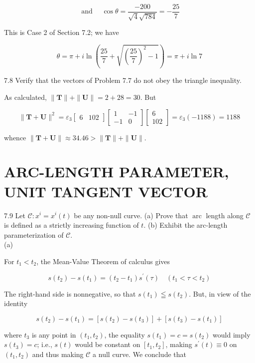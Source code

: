 \documentclass[10pt]{article}
\begin{document}
$$
\text { and } \quad \cos \theta=\frac{-200}{\sqrt{4} \sqrt{784}}=-\frac{25}{7}
$$

This is Case 2 of Section 7.2; we have

$$
\theta=\pi+i \ln \left(\frac{25}{7}+\sqrt{\left(\frac{25}{7}\right)^{2}-1}\right)=\pi+i \ln 7
$$

7.8 Verify that the vectors of Problem 7.7 do not obey the triangle inequality.

As calculated, $\|\mathbf{T}\|+\|\mathbf{U}\|=2+28=30$. But

$$
\|\mathbf{T}+\mathbf{U}\|^{2}=\varepsilon_{3}\left[\begin{array}{ll}
6 & 102
\end{array}\right]\left[\begin{array}{rr}
1 & -1 \\
-1 & 0
\end{array}\right]\left[\begin{array}{c}
6 \\
102
\end{array}\right]=\varepsilon_{3}(-1188)=1188
$$

whence $\|\mathbf{T}+\mathbf{U}\| \approx 34.46>\|\mathbf{T}\|+\|\mathbf{U}\|$.

\section*{ARC-LENGTH PARAMETER, UNIT TANGENT VECTOR}
7.9 Let $\mathscr{C}: x^{i}=x^{i}(t)$ be any non-null curve. (a) Prove that $\operatorname{arc}$ length along $\mathscr{C}$ is defined as a strictly increasing function of $t$. (b) Exhibit the arc-length parameterization of $\mathscr{C}$.\\
(a)

For $t_{1}<t_{2}$, the Mean-Value Theorem of calculus gives

$$
s\left(t_{2}\right)-s\left(t_{1}\right)=\left(t_{2}-t_{1}\right) s^{\prime}(\tau) \quad\left(t_{1}<\tau<t_{2}\right)
$$

The right-hand side is nonnegative, so that $s\left(t_{1}\right) \leqq s\left(t_{2}\right)$. But, in view of the identity

$$
s\left(t_{2}\right)-s\left(t_{1}\right)=\left[s\left(t_{2}\right)-s\left(t_{3}\right)\right]+\left[s\left(t_{3}\right)-s\left(t_{1}\right)\right]
$$

where $t_{3}$ is any point in $\left(t_{1}, t_{2}\right)$, the equality $s\left(t_{1}\right)=c=s\left(t_{2}\right)$ would imply $s\left(t_{3}\right)=c$; i.e., $s(t)$ would be constant on $\left[t_{1}, t_{2}\right]$, making $s^{\prime}(t) \equiv 0$ on $\left(t_{1}, t_{2}\right)$ and thus making $\mathscr{C}$ a null curve. We conclude that
\end{document}
